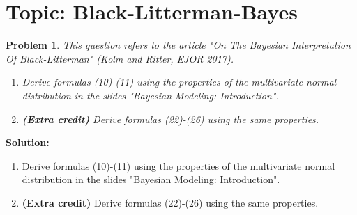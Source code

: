 \documentclass[11pt]{article}
\theoremstyle{plain} %
\newtheorem{problem}[theorem]{Problem}
\newenvironment{solution}
{\color{C2}\normalfont\begin{framed}\begingroup\textbf{Solution:} }
  {\endgroup\end{framed}}
\theoremstyle{remark}
\begin{document}
\begin{center}

  {}
\end{center}
\vspace{2em}

\tableofcontents

\section{Topic: Black-Litterman-Bayes}
\begin{problem}
This question refers to the article "On The Bayesian Interpretation Of Black-Litterman" (Kolm and Ritter, EJOR 2017).
\begin{enumerate}[label=(\alph*)]
  \item Derive formulas (10)-(11) using the properties of the multivariate normal distribution in the slides "Bayesian Modeling: Introduction".
  \item \textbf{(Extra credit)} Derive formulas (22)-(26) using the same properties.
\end{enumerate}
\end{problem}
\begin{solution}
  \begin{enumerate}[label=(\alph*)]
    \item Derive formulas (10)-(11) using the properties of the multivariate normal distribution in the slides "Bayesian Modeling: Introduction".
    \item \textbf{(Extra credit)} Derive formulas (22)-(26) using the same properties.
  \end{enumerate}
\end{solution}
\end{document}
